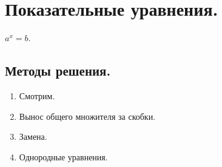 \documentclass[12pt]{article}
\begin{document}
	\section{Показательные уравнения.}
	\begin{definition}
		$a^x = b$.
	\end{definition}
	\subsection{Методы решения.}
	\begin{enumerate}
		\item Смотрим.
		\item Вынос общего множителя за скобки.
		\item Замена.
		\item Однородные уравнения.
	\end{enumerate}
\end{document}
